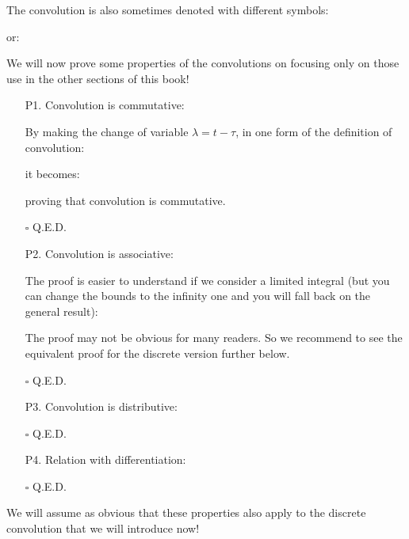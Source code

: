 	
	\begin{tcolorbox}[title=Remark,colframe=black,arc=10pt]
	The convolution is also sometimes denoted with different symbols:
	
	or:
	
	\end{tcolorbox}
	We will now prove some properties of the convolutions on focusing only on those use in the other sections of this book!
	\begin{itemize}
		\item[P1.] Convolution is commutative:
		
		\begin{dem}
		By making the change of variable $\lambda=t-\tau$, in one form of the definition of convolution:
		
		it becomes:
		
		proving that convolution is commutative.
		\begin{flushright}
			$\square$  Q.E.D.
		\end{flushright}
		\end{dem}
		
		\item[P2.] Convolution is associative:
		
		\begin{dem}
		The proof is easier to understand if we consider a limited integral (but you can change the bounds to the infinity one and you will fall back on the general result):
		
		 The proof may not be obvious for many readers. So we recommend to see the equivalent proof for the discrete version further below.
		\begin{flushright}
			$\square$  Q.E.D.
		\end{flushright}
		\end{dem}
		
		\item[P3.] Convolution is distributive:
		
		\begin{dem}
		
		\begin{flushright}
			$\square$  Q.E.D.
		\end{flushright}
		\end{dem}
		
		\item[P4.] Relation with differentiation:
		
		\begin{dem}
		
		\begin{flushright}
			$\square$  Q.E.D.
		\end{flushright}
		\end{dem}
	\end{itemize}
	We will assume as obvious that these properties also apply to the discrete convolution that we will introduce now!
	
